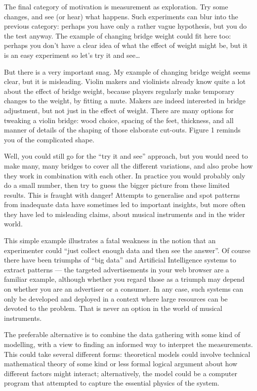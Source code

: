   The final category of motivation is measurement as exploration. Try some 
  changes, and see (or hear) what happens. Such experiments can blur into the 
  previous category: perhaps you have only a rather vague hypothesis, but you 
  do the test anyway. The example of changing bridge weight could fit here too: 
  perhaps you don’t have a clear idea of what the effect of weight might be, 
  but it is an easy experiment so let’s try it and see… 

  But there is a very important snag. My example of changing bridge weight 
  seems clear, but it is misleading. Violin makers and violinists already know 
  quite a lot about the effect of bridge weight, because players regularly make 
  temporary changes to the weight, by fitting a mute. Makers are indeed 
  interested in bridge adjustment, but not just in the effect of weight. There 
  are many options for tweaking a violin bridge: wood choice, spacing of the 
  feet, thickness, and all manner of details of the shaping of those elaborate 
  cut-outs. Figure 1 reminds you of the complicated shape. 


  Well, you could still go for the “try it and see” approach, but you would 
  need to make many, many bridges to cover all the different variations, and 
  also probe how they work in combination with each other. In practice you 
  would probably only do a small number, then try to guess the bigger picture 
  from these limited results. This is fraught with danger! Attempts to 
  generalise and spot patterns from inadequate data have sometimes led to 
  important insights, but more often they have led to misleading claims, about 
  musical instruments and in the wider world. 

  This simple example illustrates a fatal weakness in the notion that an 
  experimenter could “just collect enough data and then see the answer”. Of 
  course there have been triumphs of “big data” and Artificial Intelligence 
  systems to extract patterns — the targeted advertisements in your web browser 
  are a familiar example, although whether you regard those as a triumph may 
  depend on whether you are an advertiser or a consumer. In any case, such 
  systems can only be developed and deployed in a context where large resources 
  can be devoted to the problem. That is never an option in the world of 
  musical instruments. 

  The preferable alternative is to combine the data gathering with some kind of 
  modelling, with a view to finding an informed way to interpret the 
  measurements. This could take several different forms: theoretical models 
  could involve technical mathematical theory of some kind or less formal 
  logical argument about how different factors might interact; alternatively, 
  the model could be a computer program that attempted to capture the essential 
  physics of the system. 

